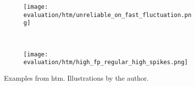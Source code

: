 \begin{figure}
    \ContinuedFloat{}
    \begin{subfigure}[b]{\linewidth}
        \centering
        \texttt{[image: evaluation/htm/unreliable\_on\_fast\_fluctuation.png]}
        \label{fig:htm-subtle-overlooked}
    \end{subfigure}
    \\
    \begin{subfigure}[b]{\linewidth}
        \centering
        \texttt{[image: evaluation/htm/high\_fp\_regular\_high\_spikes.png]}
        \label{fig:htm-spikes}
    \end{subfigure}
\caption[Examples from \gls{htm}.]{Examples from \gls{htm}. Illustrations by the author.}\label{fig:htm-output}
\end{figure}